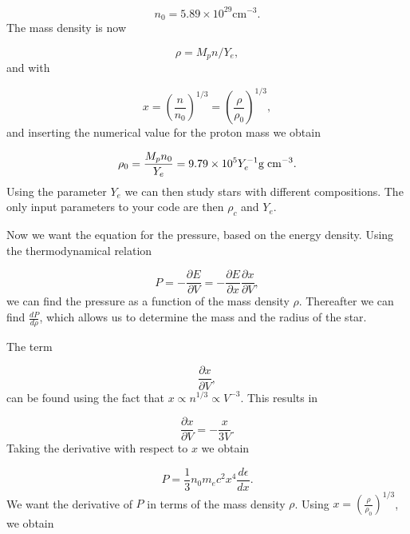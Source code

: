 \documentclass[%
oneside,                 %
final,                   %
10pt]{article}
\begin{document}
\begin{equation*}
n_{0}=5.89\times 10^{29} \mathrm{cm}^{-3}.
\end{equation*}
The mass density is now

\begin{equation*}
\rho = M_p n/Y_e,
\end{equation*}
and with

\begin{equation*}
x=\left(\frac{n}{n_{0}}\right)^{1/3}=\left(\frac{\rho}{\rho_{0}}\right)^{1/3},
\end{equation*}
and inserting the numerical value for the proton mass we obtain

\begin{equation*}
\rho_{0}=\frac{M_{p}n_{0}}{Y_{e}}=9.79\times 10^{5}Y_{e}^{-1} \mathrm{g}\hspace{1mm}
\mathrm{cm}^{-3}.
\end{equation*}
Using the parameter $Y_{e}$ we can then study stars with different compositions.
The only input parameters to your code are then $\rho_c$ and $Y_e$.

Now we want the equation for the pressure, based on the energy density.
Using the thermodynamical relation

\begin{equation*}
P=-\frac{\partial E}{\partial V}=-\frac{\partial E}{\partial x}
\frac{\partial x}{\partial V},
\end{equation*}
we can find the pressure as a function of the mass density $\rho$.
Thereafter we can find $\frac{dP}{d\rho}$, which allows us to 
determine the mass and the radius of the star. 

The term

\begin{equation*}
\frac{\partial x}{\partial V},
\end{equation*}
can be found using the fact that  $x\propto n^{1/3} \propto V^{-3}$. This results in

\begin{equation*}
\frac{\partial x}{\partial V}= -\frac{x}{3V}.
\end{equation*}
Taking the derivative with respect to $x$ we obtain

\begin{equation*}
P=\frac{1}{3}n_0m_ec^2 x^4\frac{d\epsilon}{dx}.
\end{equation*}
We want the derivative of  $P$ in terms of the mass density $\rho$. Using
$x=\left(\frac{\rho}{\rho_{0}}\right)^{1/3}$, we obtain
\end{document}
